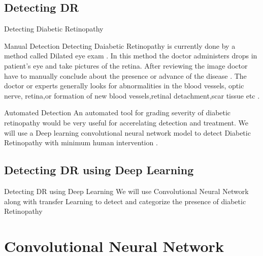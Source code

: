 \documentclass[10pt]{beamer}
\begin{document}
		\subsection{Detecting DR}
			\begin{frame}{Detecting Diabetic Retinopathy}
				\begin{block}{Manual Detection}
				Detecting Daiabetic Retinopathy is currently done by a method  called Dilated eye exam . In this method the doctor administers drops in patient's eye and take pictures of the retina. After reviewing  the image doctor have to manually conclude about the presence or advance of the disease . The doctor or experts generally looks for abnormalities in the blood vessels, optic nerve, retina,or formation of new blood vessels,retinal detachment,scar tissue etc .
				\end{block}\pause
				\begin{block}{Automated Detection}
				An automated tool for grading severity of diabetic retinopathy would be very useful for accerelating detection and treatment. We will use a Deep learning convolutional neural network model to detect Diabetic Retinopathy with minimum human intervention .
				\end{block}
			
			\end{frame}
		\subsection{Detecting DR using Deep Learning}
			\begin{frame}{Detecting DR using Deep Learning}
				We will use Convolutional Neural Network along with transfer Learning to detect and categorize the presence of diabetic Retinopathy 
			\end{frame}
	\section{Convolutional Neural Network}
\end{document}
